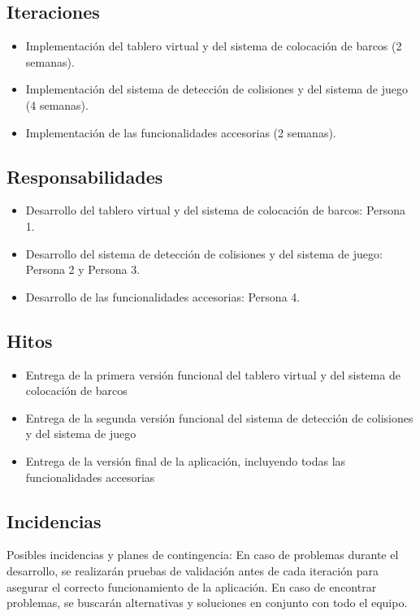 \documentclass[a4paper,openright,12pt]{article}
\begin{document}
\subsection{Iteraciones}
\begin{itemize}
\item Implementación del tablero virtual y del sistema de colocación de barcos (2 semanas).
\item Implementación del sistema de detección de colisiones y del sistema de juego (4 semanas).
\item Implementación de las funcionalidades accesorias (2 semanas).
\end{itemize}
\subsection{Responsabilidades}
\begin{itemize}
\item Desarrollo del tablero virtual y del sistema de colocación de barcos: Persona 1.
\item Desarrollo del sistema de detección de colisiones y del sistema de juego: Persona 2 y Persona 3.
\item Desarrollo de las funcionalidades accesorias: Persona 4.
\end{itemize}
\subsection{Hitos}
\begin{itemize}
\item Entrega de la primera versión funcional del tablero virtual y del sistema de colocación de barcos
\item Entrega de la segunda versión funcional del sistema de detección de colisiones y del sistema de juego
\item Entrega de la versión final de la aplicación, incluyendo todas las funcionalidades accesorias
\end{itemize}
\subsection{Incidencias}
Posibles incidencias y planes de contingencia:
En caso de problemas durante el desarrollo, se realizarán pruebas de validación antes de cada iteración para asegurar el correcto funcionamiento de la aplicación. En caso de encontrar problemas, se buscarán alternativas y soluciones en conjunto con todo el equipo.
\end{document}
